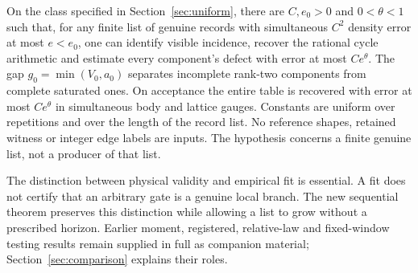 \begin{theorem}
\label{thm:uniform-main}
On the class specified in Section~\ref{sec:uniform}, there are $C,e_0>0$
and $0<\theta<1$ such that, for any finite list of genuine records with
simultaneous $C^2$ density error at most $e<e_0$, one can identify visible
incidence, recover the rational cycle arithmetic and estimate every
component's defect with error at most $Ce^\theta$. The gap
$g_0=\min(V_0,a_0)$ separates incomplete rank-two components from complete
saturated ones. On acceptance the entire table is recovered with error
at most $Ce^\theta$ in simultaneous body and lattice gauges. Constants
are uniform over repetitions and over the length of the record list.
No reference shapes, retained witness or integer edge labels are inputs.
The hypothesis concerns a finite genuine list, not a producer of that list.
\end{theorem}

The distinction between physical validity and empirical fit is essential.
A fit does not certify that an arbitrary gate is a genuine local branch.
The new sequential theorem preserves this distinction while allowing a
list to grow without a prescribed horizon. Earlier moment, registered,
relative-law and fixed-window testing results remain supplied in full as
companion material; Section~\ref{sec:comparison} explains their roles.
